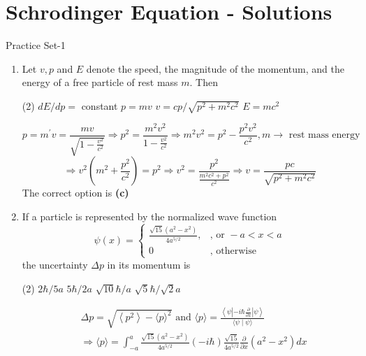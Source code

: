 \chapter{Schrodinger Equation - Solutions}
\begin{abox}
	Practice Set-1 
	\end{abox}
\begin{enumerate}
	\item Let $v, p$ and $E$ denote the speed, the magnitude of the momentum, and the energy of a free particle of rest mass $m$. Then
	{}
\begin{tasks}(2)
	\task[\textbf{A.}] $d E / d p=$ constant
	\task[\textbf{B.}]$p=m v$
	\task[\textbf{C.}]$v=c p / \sqrt{p^{2}+m^{2} c^{2}}$
	\task[\textbf{D.}] $E=m c^{2}$
\end{tasks}
\begin{answer}
	$$p=m^{\prime} v=\frac{m v}{\sqrt{1-\frac{v^{2}}{c^{2}}}} \Rightarrow p^{2}=\frac{m^{2} v^{2}}{1-\frac{v^{2}}{c^{2}}} \Rightarrow m^{2} v^{2}=p^{2}-\frac{p^{2} v^{2}}{c^{2}}, m \rightarrow \text { rest mass energy }$$
	$$\Rightarrow v^{2}\left(m^{2}+\frac{p^{2}}{c^{2}}\right)=p^{2} \Rightarrow v^{2}=\frac{p^{2}}{\frac{m^{2} c^{2}+p^{2}}{c^{2}}} \Rightarrow v=\frac{p c}{\sqrt{p^{2}+m^{2} c^{2}}}$$
	The correct option is \textbf{(c)}
\end{answer}
\item If a particle is represented by the normalized wave function
$$
\psi(x)= \begin{cases}\frac{\sqrt{15}\left(a^{2}-x^{2}\right)}{4 a^{5 / 2}}, & \text {, or }-a<x<a \\ 0 & , \text { otherwise }\end{cases}
$$
the uncertainty $\Delta p$ in its momentum is
	{}
\begin{tasks}(2)
	\task[\textbf{A.}] $2 \hbar / 5 a$
	\task[\textbf{B.}] $5 \hbar / 2 a$
	\task[\textbf{C.}]$\sqrt{10} \hbar / a$
	\task[\textbf{D.}]$\sqrt{5} \hbar / \sqrt{2} a$
\end{tasks}
\begin{answer}
	\begin{align*}
	&\Delta p=\sqrt{\left\langle p^{2}\right\rangle-\langle p\rangle^{2}} \text { and }\langle p\rangle=\frac{\left\langle\psi\left|-i \hbar \frac{\partial}{\partial x}\right| \psi\right\rangle}{\langle\psi \mid \psi\rangle}\\
		&\Rightarrow\langle p\rangle=\int_{-a}^{a} \frac{\sqrt{15}\left(a^{2}-x^{2}\right)}{4 a^{5 / 2}}(-i \hbar) \frac{\sqrt{15}}{4 a^{5 / 2}} \frac{\partial}{\partial x}\left(a^{2}-x^{2}\right) d x \\

\end{align*}
\end{answer}
\end{enumerate}
